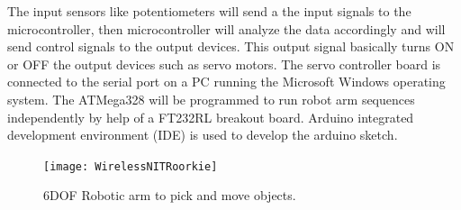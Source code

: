 \begin{enumerate}
\begin{displayquote}
			The input sensors like potentiometers will send a the input signals to the microcontroller, then microcontroller will analyze the data accordingly and will send control signals to the output devices. This output signal basically turns ON or OFF the output devices such as servo motors. The servo controller board is connected to the serial port on a PC running the Microsoft Windows operating system. The ATMega328 will be programmed to run robot arm sequences independently by help of a FT232RL breakout board. Arduino integrated development environment (IDE) is used to develop the arduino sketch.
			
			
		\end{displayquote}
		
		\begin{figure}
			\centering
			\texttt{[image: WirelessNITRoorkie]}
			\caption{6DOF Robotic arm to pick and move objects.}
			\label{fig:WirelessNITRoorkie}
		\end{figure}
		
		
		
	 


\end{enumerate}